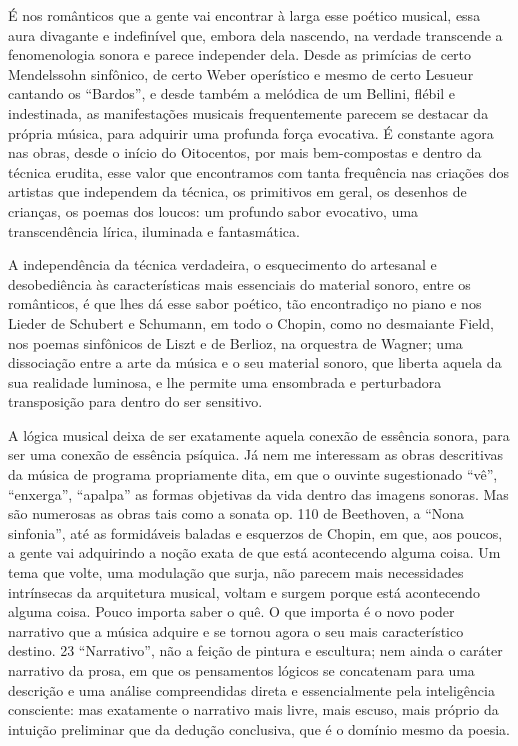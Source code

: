É nos românticos que a gente vai encontrar à larga esse poético musical,
essa aura divagante e indefinível que, embora dela nascendo, na verdade
transcende a fenomenologia sonora e parece independer dela. Desde as
primícias de certo Mendelssohn sinfônico, de certo Weber operístico e
mesmo de certo Lesueur cantando os ``Bardos'', e desde também a melódica
de um Bellini, flébil e indestinada, as manifestações musicais
frequentemente parecem se destacar da própria música, para adquirir uma
profunda força evocativa. É constante agora nas obras, desde o início do
Oitocentos, por mais bem-compostas e dentro da técnica erudita, esse
valor que encontramos com tanta frequência nas criações dos artistas que
independem da técnica, os primitivos em geral, os desenhos de crianças,
os poemas dos loucos: um profundo sabor evocativo, uma transcendência
lírica, iluminada e fantasmática.

A independência da técnica verdadeira, o esquecimento do artesanal e
desobediência às características mais essenciais do material sonoro,
entre os românticos, é que lhes dá esse sabor poético, tão encontradiço
no piano e nos Lieder de Schubert e Schumann, em todo o Chopin, como no
desmaiante Field, nos poemas sinfônicos de Liszt e de Berlioz, na
orquestra de Wagner; uma dissociação entre a arte da música e o seu
material sonoro, que liberta aquela da sua realidade luminosa, e lhe
permite uma ensombrada e perturbadora transposição para dentro do ser
sensitivo.

A lógica musical deixa de ser exatamente aquela conexão de essência
sonora, para ser uma conexão de essência psíquica. Já nem me interessam
as obras descritivas da música de programa propriamente dita, em que o
ouvinte sugestionado ``vê'', ``enxerga'', ``apalpa'' as formas objetivas
da vida dentro das imagens sonoras. Mas são numerosas as obras tais como
a sonata op. 110 de Beethoven, a ``Nona sinfonia'', até as formidáveis
baladas e esquerzos de Chopin, em que, aos poucos, a gente vai
adquirindo a noção exata de que está acontecendo alguma coisa. Um tema
que volte, uma modulação que surja, não parecem mais necessidades
intrínsecas da arquitetura musical, voltam e surgem porque está
acontecendo alguma coisa. Pouco importa saber o quê. O que importa é o
novo poder narrativo que a música adquire e se tornou agora o seu mais
característico destino. 23 ``Narrativo'', não a feição de pintura e
escultura; nem ainda o caráter narrativo da prosa, em que os pensamentos
lógicos se concatenam para uma descrição e uma análise compreendidas
direta e essencialmente pela inteligência consciente: mas exatamente o
narrativo mais livre, mais escuso, mais próprio da intuição preliminar
que da dedução conclusiva, que é o domínio mesmo da poesia.

